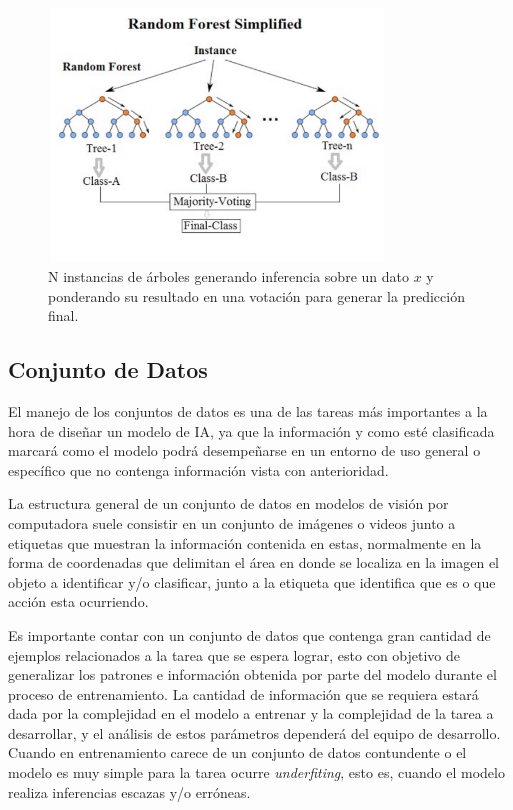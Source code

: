 \documentclass[letter,12pt]{report}
\begin{document}
\begin{figure}[H]
    \centering
    \includegraphics[width=0.8\textwidth]{forest}
    \caption{N instancias de árboles generando inferencia sobre un dato $x$ y ponderando
    su resultado en una votación para generar la predicción final.}
    \label{fig:forest}
\end{figure}

\subsection{Conjunto de Datos}
El manejo de los conjuntos de datos \cite{Manage} es una de las tareas más importantes a la hora de
diseñar un modelo de IA, ya que la información y como esté clasificada marcará como el
modelo podrá desempeñarse en un entorno de uso general o específico que no contenga
información vista con anterioridad.

La estructura general de un conjunto de datos en modelos de visión por computadora suele
consistir en un conjunto de imágenes o videos junto a etiquetas que muestran la
información contenida en estas, normalmente en la forma de coordenadas que delimitan el
área en donde se localiza en la imagen el objeto a identificar y/o clasificar, junto a la
etiqueta que identifica que es o que acción esta ocurriendo.

Es importante contar con un conjunto de datos que contenga gran cantidad de ejemplos
relacionados a la tarea que se espera lograr, esto con objetivo de generalizar los
patrones e información obtenida por parte del modelo durante el proceso de entrenamiento.
La cantidad de información que se requiera estará dada por la complejidad en el modelo a
entrenar y la complejidad de la tarea a desarrollar, y el análisis de estos parámetros
dependerá del equipo de desarrollo. Cuando en entrenamiento carece de un conjunto de
datos contundente o el modelo es muy simple para la tarea ocurre \textit{underfiting},
esto es, cuando el modelo realiza inferencias escazas y/o erróneas.
\end{document}
